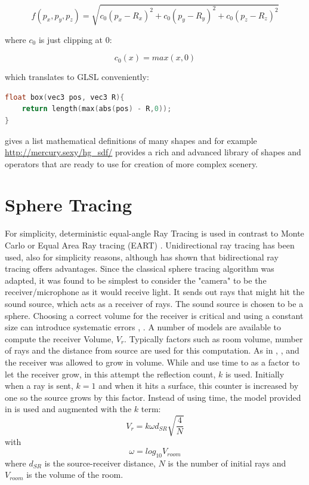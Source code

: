 \documentclass[twoside,a4paper]{article}
\begin{document}
\begin{equation}
  f(p_x, p_y, p_z) = \sqrt{c_0(p_x - R_x)^2 + c_0(p_y - R_y)^2 + c_0(p_z - R_z)^2}
\end{equation}

where $c_0$ is just clipping at 0:

\begin{equation}
c_0(x) = max(x,0) 
\end{equation}

which translates to GLSL conveniently:

\begin{lstlisting}[language=C]
float box(vec3 pos, vec3 R){
    return length(max(abs(pos) - R,0));
}
\end{lstlisting}

\cite{hart_sphere_1996} gives a list mathematical definitions of many shapes and for example \href{http://mercury.sexy/hg_sdf/}{http://mercury.sexy/hg\_sdf/} provides a rich and advanced library of shapes and operators that are ready to use for creation of more complex scenery.


\section{Sphere Tracing}
For simplicity, deterministic equal-angle Ray Tracing is used in contrast to Monte Carlo or Equal Area Ray tracing (EART) \cite{gu_room_2014}. Unidirectional ray tracing has been used, also for simplicity reasons, although \cite{cao_interactive_2016} has shown that bidirectional ray tracing offers advantages. Since the classical sphere tracing algorithm was adapted, it was found to be simplest to consider the "camera" to be the receiver/microphone as it would receive light. It sends out rays that might hit the sound source, which acts as a receiver of rays. The sound source is chosen to be a sphere. Choosing a correct volume for the receiver is critical and using a constant size can introduce systematic errors \cite{xiangyang_accuracy_2003}, \cite{alpkocak_computing_2010}. A number of models are available to compute the receiver Volume, $V_r$. Typically factors such as room volume, number of rays and the distance from source are used for this computation. 
As in \cite{brandao_ray_nodate}, \cite{alpkocak_computing_2010}, and \cite{dalenback_room_1996} the receiver was allowed to grow in volume. While \cite{brandao_ray_nodate} and \cite{dalenback_room_1996} use time to as a factor to let the receiver grow, in this attempt the reflection count, $k$ is used. Initially when a ray is sent, $k=1$ and when it hits a surface, this counter is increased by one so the source grows by this factor. Instead of using time, the model provided in \cite{alpkocak_computing_2010} is used and augmented with the $k$ term:
\begin{equation}
V_r = k \omega d_{SR}\sqrt{\frac{4}{N}}
\end{equation}
with 
\begin{equation}
\omega = log_{10}{V_{room}}
\end{equation}
where $d_{SR}$ is the source-receiver distance, $N$ is the number of initial rays and $V_{room}$ is the volume of the room.
\end{document}

